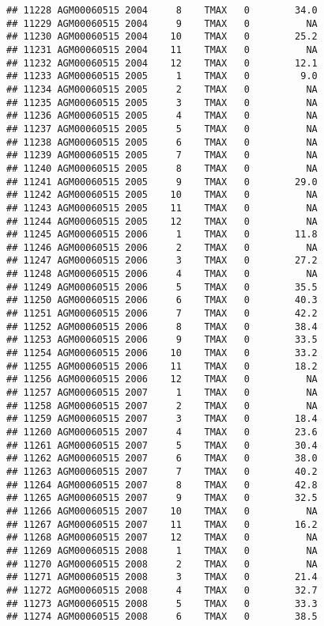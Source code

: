 \documentclass{article}\usepackage[]{graphicx}\usepackage[]{color}
\makeatletter
\newenvironment{kframe}{%
 \def\at@end@of@kframe{}%
 \ifinner\ifhmode%
  \def\at@end@of@kframe{\end{minipage}}%
  \begin{minipage}{\columnwidth}%
 \fi\fi%
 \def\FrameCommand##1{\hskip\@totalleftmargin \hskip-\fboxsep
 \colorbox{shadecolor}{##1}\hskip-\fboxsep
     \hskip-\linewidth \hskip-\@totalleftmargin \hskip\columnwidth}%
 \MakeFramed {\advance\hsize-\width
   \@totalleftmargin\z@ \linewidth\hsize
   \@setminipage}}%
 {\par\unskip\endMakeFramed%
 \at@end@of@kframe}
\newenvironment{knitrout}{}{} %
\makeatother
\begin{document}
\begin{knitrout}
\begin{kframe}
\begin{verbatim}
## 11228 AGM00060515 2004     8    TMAX   0        34.0
## 11229 AGM00060515 2004     9    TMAX   0          NA
## 11230 AGM00060515 2004    10    TMAX   0        25.2
## 11231 AGM00060515 2004    11    TMAX   0          NA
## 11232 AGM00060515 2004    12    TMAX   0        12.1
## 11233 AGM00060515 2005     1    TMAX   0         9.0
## 11234 AGM00060515 2005     2    TMAX   0          NA
## 11235 AGM00060515 2005     3    TMAX   0          NA
## 11236 AGM00060515 2005     4    TMAX   0          NA
## 11237 AGM00060515 2005     5    TMAX   0          NA
## 11238 AGM00060515 2005     6    TMAX   0          NA
## 11239 AGM00060515 2005     7    TMAX   0          NA
## 11240 AGM00060515 2005     8    TMAX   0          NA
## 11241 AGM00060515 2005     9    TMAX   0        29.0
## 11242 AGM00060515 2005    10    TMAX   0          NA
## 11243 AGM00060515 2005    11    TMAX   0          NA
## 11244 AGM00060515 2005    12    TMAX   0          NA
## 11245 AGM00060515 2006     1    TMAX   0        11.8
## 11246 AGM00060515 2006     2    TMAX   0          NA
## 11247 AGM00060515 2006     3    TMAX   0        27.2
## 11248 AGM00060515 2006     4    TMAX   0          NA
## 11249 AGM00060515 2006     5    TMAX   0        35.5
## 11250 AGM00060515 2006     6    TMAX   0        40.3
## 11251 AGM00060515 2006     7    TMAX   0        42.2
## 11252 AGM00060515 2006     8    TMAX   0        38.4
## 11253 AGM00060515 2006     9    TMAX   0        33.5
## 11254 AGM00060515 2006    10    TMAX   0        33.2
## 11255 AGM00060515 2006    11    TMAX   0        18.2
## 11256 AGM00060515 2006    12    TMAX   0          NA
## 11257 AGM00060515 2007     1    TMAX   0          NA
## 11258 AGM00060515 2007     2    TMAX   0          NA
## 11259 AGM00060515 2007     3    TMAX   0        18.4
## 11260 AGM00060515 2007     4    TMAX   0        23.6
## 11261 AGM00060515 2007     5    TMAX   0        30.4
## 11262 AGM00060515 2007     6    TMAX   0        38.0
## 11263 AGM00060515 2007     7    TMAX   0        40.2
## 11264 AGM00060515 2007     8    TMAX   0        42.8
## 11265 AGM00060515 2007     9    TMAX   0        32.5
## 11266 AGM00060515 2007    10    TMAX   0          NA
## 11267 AGM00060515 2007    11    TMAX   0        16.2
## 11268 AGM00060515 2007    12    TMAX   0          NA
## 11269 AGM00060515 2008     1    TMAX   0          NA
## 11270 AGM00060515 2008     2    TMAX   0          NA
## 11271 AGM00060515 2008     3    TMAX   0        21.4
## 11272 AGM00060515 2008     4    TMAX   0        32.7
## 11273 AGM00060515 2008     5    TMAX   0        33.3
## 11274 AGM00060515 2008     6    TMAX   0        38.5

\end{verbatim}
\end{kframe}
\end{knitrout}
\end{document}
